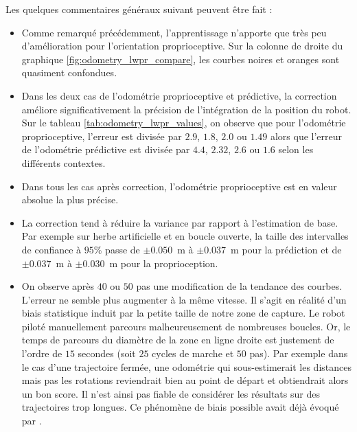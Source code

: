 Les quelques commentaires généraux suivant peuvent être fait :
\begin{itemize}
    \item Comme remarqué précédemment, l'apprentissage n'apporte 
        que très peu d'amélioration pour l'orientation proprioceptive.
        Sur la colonne de droite du graphique \ref{fig:odometry_lwpr_compare},
        les courbes noires et oranges sont quasiment confondues.
    \item Dans les deux cas de l'odométrie proprioceptive et prédictive, la correction
        améliore significativement la précision de l'intégration de la position du robot.
        Sur le tableau \ref{tab:odometry_lwpr_values}, on observe que pour 
        l'odométrie proprioceptive, l'erreur est divisée par $2.9$, $1.8$, $2.0$ ou $1.49$
        alors que l'erreur de l'odométrie prédictive est divisée par $4.4$, $2.32$, $2.6$ ou $1.6$
        selon les différents contextes.
    \item Dans tous les cas après correction, l'odométrie proprioceptive est en valeur
        absolue la plus précise.
    \item La correction tend à réduire la variance par rapport à l'estimation de base.
        Par exemple sur herbe artificielle et en boucle ouverte, la taille des intervalles
        de confiance à $95$\% passe de $\pm0.050$~m à $\pm0.037$~m pour la prédiction
        et de $\pm0.037$~m à $\pm0.030$~m pour la proprioception.
    \item On observe après $40$ ou $50$ pas une modification de la tendance des courbes.
        L'erreur ne semble plus augmenter à la même vitesse.
        Il s'agit en réalité d'un biais statistique induit par la petite taille de notre
        zone de capture. Le robot piloté manuellement parcours malheureusement de nombreuses boucles.
        Or, le temps de parcours du diamètre de la zone en ligne droite est justement de l'ordre de 
        $15$ secondes (soit $25$ cycles de marche et $50$ pas).
        Par exemple dans le cas d'une trajectoire fermée, une odométrie 
        qui sous-estimerait les distances mais pas les rotations reviendrait 
        bien au point de départ et obtiendrait alors un bon score.
        Il n'est ainsi pas fiable de considérer les résultats sur 
        des trajectoires trop longues.
        Ce phénomène de biais possible avait déjà évoqué par \cite{antonelli_calibration_2005}.\\
\end{itemize}

